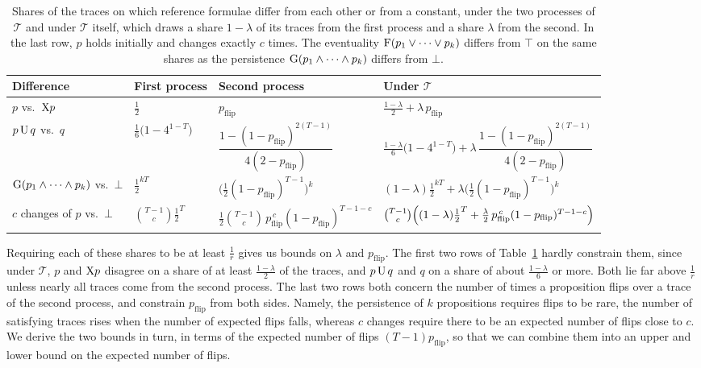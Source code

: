 \documentclass[titlepage,a4paper,11pt]{report}
\begin{document}
    \begin{table}[ht]
        \centering
        \caption{Shares of the traces on which reference formulae differ from each other or from a constant, under the two processes of $\mathcal T$ and under $\mathcal T$ itself, which draws a share $1-\lambda$ of its traces from the first process and a share $\lambda$ from the second. In the last row, $p$ holds initially and changes exactly $c$ times. The eventuality $\text{F}(p_1\lor\dots\lor p_k)$ differs from $\top$ on the same shares as the persistence $\text{G}(p_1\land\dots\land p_k)$ differs from $\bot$.
        \vspace{15pt}}
        \label{tab:reference_shares}
        \begin{tabular}{llll}
            \toprule
            Difference & First process & Second process & Under $\mathcal T$ \\
            \midrule
            $p$ vs.\ $\text{X} p$ & $\frac12$ & $p_{\text{flip}}$ & $\frac{1-\lambda}{2}+\lambda\,p_{\text{flip}}$ \\[4pt]
            $p\,\text{U}\,q$ vs.\ $q$ & $\frac16\bigl(1-4^{1-T}\bigr)$ & $\dfrac{1-(1-p_{\text{flip}})^{2(T-1)}}{4(2-p_{\text{flip}})}$ & $\frac{1-\lambda}{6}\bigl(1-4^{1-T}\bigr)+\lambda\,\dfrac{1-(1-p_{\text{flip}})^{2(T-1)}}{4(2-p_{\text{flip}})}$ \\[10pt]
            $\text{G}(p_1\land\dots\land p_k)$ vs.\ $\bot$ & $\frac12^{kT}$ & $\bigl(\frac12(1-p_{\text{flip}})^{T-1}\bigr)^k$ & $(1-\lambda)\frac12^{kT}+\lambda\bigl(\frac12(1-p_{\text{flip}})^{T-1}\bigr)^k$ \\[4pt]
            $c$ changes of $p$ vs.\ $\bot$ & $\binom{T-1}{c}\frac12^{T}$ & $\frac12\binom{T-1}{c}\,p_{\text{flip}}^{\,c}(1-p_{\text{flip}})^{T-1-c}$ & $\binom{T-1}{c}\Bigl((1-\lambda)\frac12^{T}+\frac\lambda2\,p_{\text{flip}}^{\,c}(1-p_{\text{flip}})^{T-1-c}\Bigr)$ \\
            \bottomrule
        \end{tabular}
    \end{table}

    Requiring each of these shares to be at least $\frac1r$ gives us bounds on $\lambda$ and $p_{\text{flip}}$. The first two rows of Table~\ref{tab:reference_shares} hardly constrain them, since under $\mathcal T$, $p$ and $\text{X} p$ disagree on a share of at least $\frac{1-\lambda}{2}$ of the traces, and $p\,\text{U}\,q$ and $q$ on a share of about $\frac{1-\lambda}{6}$ or more. Both lie far above $\frac1r$ unless nearly all traces come from the second process. The last two rows both concern the number of times a proposition flips over a trace of the second process, and constrain $p_{\text{flip}}$ from both sides. Namely, the persistence of $k$ propositions requires flips to be rare, the number of satisfying traces rises when the number of expected flips falls, whereas $c$ changes require there to be an expected number of flips close to $c$. We derive the two bounds in turn, in terms of the expected number of flips $(T-1)p_{\text{flip}}$, so that we can combine them into an upper and lower bound on the expected number of flips.
\end{document}
